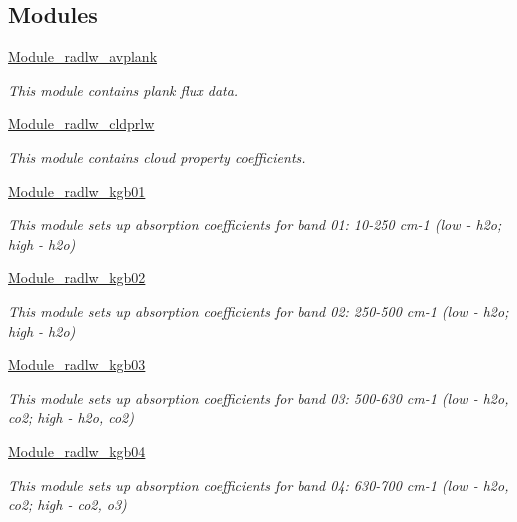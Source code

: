 \subsection*{Modules}
\begin{DoxyCompactItemize}
\item 
\hyperlink{group__module__radlw__avplank}{Module\+\_\+radlw\+\_\+avplank}
\begin{DoxyCompactList}\small\item\em This module contains plank flux data. \end{DoxyCompactList}\item 
\hyperlink{group__module__radlw__cldprlw}{Module\+\_\+radlw\+\_\+cldprlw}
\begin{DoxyCompactList}\small\item\em This module contains cloud property coefficients. \end{DoxyCompactList}\item 
\hyperlink{group__module__radlw__kgb01}{Module\+\_\+radlw\+\_\+kgb01}
\begin{DoxyCompactList}\small\item\em This module sets up absorption coefficients for band 01\+: 10-\/250 cm-\/1 (low -\/ h2o; high -\/ h2o) \end{DoxyCompactList}\item 
\hyperlink{group__module__radlw__kgb02}{Module\+\_\+radlw\+\_\+kgb02}
\begin{DoxyCompactList}\small\item\em This module sets up absorption coefficients for band 02\+: 250-\/500 cm-\/1 (low -\/ h2o; high -\/ h2o) \end{DoxyCompactList}\item 
\hyperlink{group__module__radlw__kgb03}{Module\+\_\+radlw\+\_\+kgb03}
\begin{DoxyCompactList}\small\item\em This module sets up absorption coefficients for band 03\+: 500-\/630 cm-\/1 (low -\/ h2o, co2; high -\/ h2o, co2) \end{DoxyCompactList}\item 
\hyperlink{group__module__radlw__kgb04}{Module\+\_\+radlw\+\_\+kgb04}
\begin{DoxyCompactList}\small\item\em This module sets up absorption coefficients for band 04\+: 630-\/700 cm-\/1 (low -\/ h2o, co2; high -\/ co2, o3) \end{DoxyCompactList}\item 

\end{DoxyCompactItemize}

